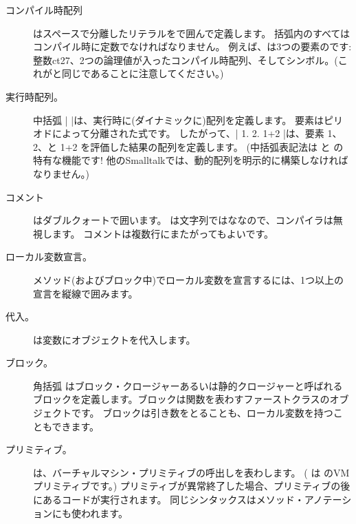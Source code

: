 \documentclass[a4paper,10pt,twoside]{book}
\begin{document}
\begin{description}
\item[コンパイル時配列] はスペースで分離したリテラルを\ct{#( )}で囲んで定義します。
		括弧内のすべてはコンパイル時に定数でなければなりません。
		例えば、は3つの要素のです: 整数ct{27}、2つの論理値が入ったコンパイル時配列、そしてシンボル。(これがと同じであることに注意してください。)

\item[実行時配列。] 中括弧 \ct|{ }|は、実行時に(ダイナミックに)配列を定義します。
		要素はピリオドによって分離された式です。
		したがって、\ct|{ 1. 2. 1+2 }|は、要素 1、 2、と 1+2 を評価した結果の配列を定義します。
		(中括弧表記法は \pharo と \squeak の特有な機能です!
		他のSmalltalkでは、動的配列を明示的に構築しなければなりません。)

\item[コメント]はダブルクォートで囲います。
		 は文字列ではななので、\pharo コンパイラは無視します。
		コメントは複数行にまたがってもよいです。
		
\item[ローカル変数宣言。] メソッド(およびブロック中)でローカル変数を宣言するには、1つ以上の宣言を縦線\ct{| |}で囲みます。

\item[代入。] \ct{:=} は変数にオブジェクトを代入します。

\item[ブロック。] 角括弧 \ct{[ ]} はブロック・クロージャーあるいは静的クロージャーと呼ばれるブロックを定義します。ブロックは関数を表わすファーストクラスのオブジェクトです。
		ブロックは引き数をとることも、ローカル変数を持つこともできます。

\item[プリミティブ。] は、バーチャルマシン・プリミティブの呼出しを表わします。
	( は のVMプリミティブです。)
	プリミティブが異常終了した場合、プリミティブの後にあるコードが実行されます。
	同じシンタックスはメソッド・アノテーションにも使われます。


\end{description}
\end{document}
